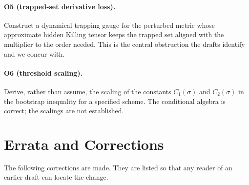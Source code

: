 \documentclass[11pt, a4paper]{article}
\theoremstyle{remark}
\theoremstyle{definition}
\begin{document}
\paragraph{O5 (trapped-set derivative loss).} Construct a dynamical trapping gauge for the perturbed metric whose approximate hidden Killing tensor keeps the trapped set aligned with the multiplier to the order needed. This is the central obstruction the drafts identify and we concur with.

\paragraph{O6 (threshold scaling).} Derive, rather than assume, the scaling of the constants $C_1(\sigma)$ and $C_2(\sigma)$ in the bootstrap inequality for a specified scheme. The conditional algebra is correct; the scalings are not established.

\section{Errata and Corrections}
\label{sec:errata}

The following corrections are made. They are listed so that any reader of an earlier draft can locate the change.
\end{document}
